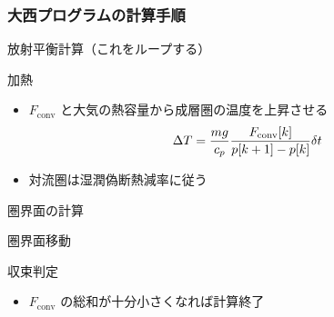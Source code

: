 \documentclass[aspectratio=149]{beamer}
\newcommand{\hmfconv}{F_\mathrm{conv}}
\begin{document}
\begin{frame}
	\frametitle{大西プログラムの計算手順}
	\begin{enu}[resume*=pros]
		\item 放射平衡計算（これをループする）
			\begin{enu}[series=rad]
				\item 加熱
					\begin{itemize}
						\item \(\hmfconv\) と大気の熱容量から成層圏の温度を上昇させる
							\begin{equation}
								\scriptsize
								\Delta T=\frac{mg}{c_p}\frac{\hmfconv[k]}{p[k+1]-p[k]}\delta t
							\end{equation}
						\item 対流圏は湿潤偽断熱減率に従う
					\end{itemize}
				\item 圏界面の計算
				\item 圏界面移動
				\item 収束判定
					\begin{itemize}
						\item \(\hmfconv\) の総和が十分小さくなれば計算終了
					\end{itemize}
			\end{enu}
	\end{enu}
\end{frame}
\end{document}
